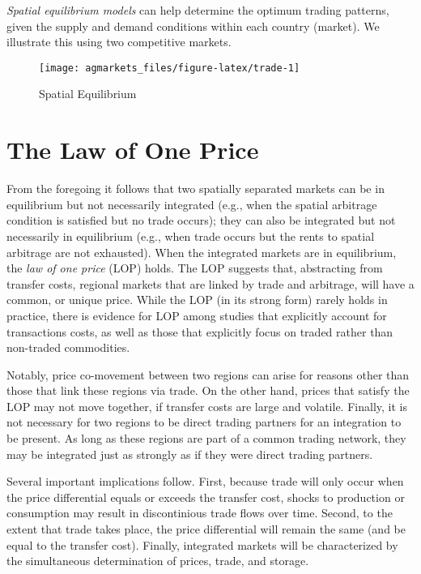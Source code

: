 \documentclass[
  oneside]{book}
\begin{document}
\emph{Spatial equilibrium models} can help determine the optimum trading patterns, given the supply and demand conditions within each country (market). We illustrate this using two competitive markets.

\begin{figure}

{\centering \texttt{[image: agmarkets\_files/figure-latex/trade-1]} 

}

\caption{Spatial Equilibrium}\label{fig:trade}
\end{figure}

\hypertarget{the-law-of-one-price}{%
\section{The Law of One Price}\label{the-law-of-one-price}}

From the foregoing it follows that two spatially separated markets can be in equilibrium but not necessarily integrated (e.g., when the spatial arbitrage condition is satisfied but no trade occurs); they can also be integrated but not necessarily in equilibrium (e.g., when trade occurs but the rents to spatial arbitrage are not exhausted). When the integrated markets are in equilibrium, the \emph{law of one price} (LOP) holds. The LOP suggests that, abstracting from transfer costs, regional markets that are linked by trade and arbitrage, will have a common, or unique price. While the LOP (in its strong form) rarely holds in practice, there is evidence for LOP among studies that explicitly account for transactions costs, as well as those that explicitly focus on traded rather than non-traded commodities.

Notably, price co-movement between two regions can arise for reasons other than those that link these regions via trade. On the other hand, prices that satisfy the LOP may not move together, if transfer costs are large and volatile. Finally, it is not necessary for two regions to be direct trading partners for an integration to be present. As long as these regions are part of a common trading network, they may be integrated just as strongly as if they were direct trading partners.

Several important implications follow. First, because trade will only occur when the price differential equals or exceeds the transfer cost, shocks to production or consumption may result in discontinious trade flows over time. Second, to the extent that trade takes place, the price differential will remain the same (and be equal to the transfer cost). Finally, integrated markets will be characterized by the simultaneous determination of prices, trade, and storage.
\end{document}
